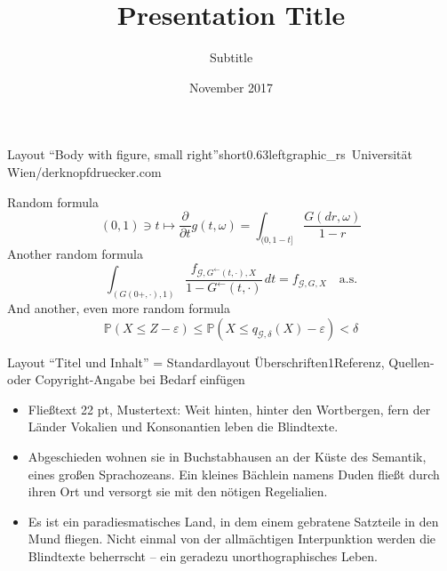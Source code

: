 \documentclass[hyperref={pdfpagelabels=false}, aspectratio=43, t]{beamer}  %
\title{Presentation Title}											%
\subtitle{Subtitle}                   					%
\date{November 2017}              									%
\begin{document}

\maketitle

													




\begin{graphicsFrame}{Layout ``Body with figure, small right''}{short}{0.63}{left}{graphic_rs}{\textcopyright~Universität Wien/derknopfdruecker.com}

		Random formula
		\[
			(0,1)\ni t\mapsto\frac{\partial}{\partial t} g(t,\omega)=\int_{( 0,1-t]}\frac{G(dr,\omega)}{1-r}
		\]
		Another random formula
		\begin{equation}\label{eq1}
			\int_{( G(0+,\cdot),1)}\frac{ f_{\mathcal{G},G^{\leftarrow}(t,\cdot),X}}{1-G^{\leftarrow}(t,\cdot)}\,dt
			= f_{\mathcal{G},G,X}\quad \textrm{a.s.}
		\end{equation}
		And another, even more random formula
		\[
			\mathbb{P}(X\leq Z-\varepsilon)\leq
			\mathbb{P}(X\leq q_{\mathcal{G},\delta}(X)-\varepsilon )< \delta
		\]

\end{graphicsFrame}
													

\begin{textFrame}{Layout ``Titel und Inhalt'' = Standardlayout Überschriften}{1}{Referenz, Quellen- oder Copyright-Angabe bei Bedarf einfügen}

	\begin{itemize}
		\item Fließtext 22 pt, Mustertext: Weit hinten, hinter den Wortbergen, fern der Länder Vokalien und Konsonantien leben die Blindtexte.
		\item Abgeschieden wohnen sie in Buchstabhausen an der Küste des Semantik, eines großen Sprachozeans. Ein kleines Bächlein namens Duden fließt durch ihren Ort und versorgt sie mit den nötigen Regelialien.
		\item Es ist ein paradiesmatisches Land, in dem einem gebratene Satzteile in den Mund fliegen. Nicht einmal von der allmächtigen Interpunktion werden die Blindtexte beherrscht – ein geradezu unorthographisches Leben.

	\end{itemize}
\end{textFrame}
\end{document}
